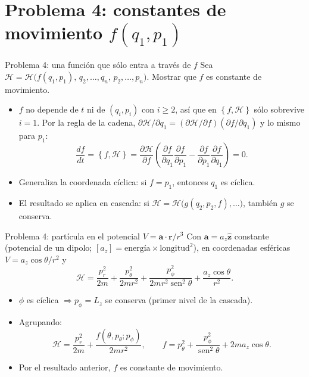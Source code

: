 \documentclass[spanish]{beamer}
\providecommand{\sen}{\operatorname{sen}}
\newcommand{\Ham}{\mathcal{H}}
\newcommand{\pd}[2]{\frac{\partial #1}{\partial #2}}
\newcommand{\pb}[2]{\left\{#1,#2\right\}}   %
\begin{document}
\section{Problema 4: constantes de movimiento \texorpdfstring{$f(q_1,p_1)$}{f(q1,p1)}}

\begin{frame}{Problema 4: una función que sólo entra a través de $f$}
Sea $\Ham = \Ham\big(f(q_1,p_1),\,q_2,\ldots,q_n,\,p_2,\ldots,p_n\big)$.
Mostrar que $f$ es constante de movimiento.
\begin{itemize}
  \item<2-> $f$ no depende de $t$ ni de $(q_i,p_i)$ con $i\ge 2$, así que en
        $\pb{f}{\Ham}$ sólo sobrevive $i=1$. Por la regla de la cadena,
        $\partial\Ham/\partial q_1 = (\partial\Ham/\partial f)(\partial f/\partial q_1)$
        y lo mismo para $p_1$:
  \[
    \frac{df}{dt} = \pb{f}{\Ham}
    = \pd{\Ham}{f}\left( \pd{f}{q_1}\pd{f}{p_1} - \pd{f}{p_1}\pd{f}{q_1} \right) = 0 .
  \]
  \item<3-> Generaliza la coordenada cíclica: si $f = p_1$, entonces $q_1$ es cíclica.
  \item<4-> El resultado se aplica en cascada: si $\Ham = \Ham\big(g(q_2,p_2,f),\ldots\big)$,
        también $g$ se conserva.
\end{itemize}
\end{frame}

\begin{frame}{Problema 4: partícula en el potencial $V = \mathbf a\cdot\mathbf r/r^3$}
Con $\mathbf a = a_z\hat{\mathbf z}$ constante (potencial de un dipolo;
$[a_z] = \text{energía}\times\text{longitud}^2$), en coordenadas esféricas
$V = a_z\cos\theta/r^2$ y
\[
  \Ham = \frac{p_r^2}{2m} + \frac{p_\theta^2}{2mr^2}
       + \frac{p_\phi^2}{2mr^2\sen^2\theta} + \frac{a_z\cos\theta}{r^2} .
\]
\begin{itemize}
  \item<2-> $\phi$ es cíclica $\Rightarrow p_\phi = L_z$ se conserva (primer nivel de la cascada).
  \item<3-> Agrupando:
  \[
    \Ham = \frac{p_r^2}{2m} + \frac{f(\theta,p_\theta;p_\phi)}{2mr^2},
    \qquad
    f = p_\theta^2 + \frac{p_\phi^2}{\sen^2\theta} + 2ma_z\cos\theta .
  \]
  \item<4-> Por el resultado anterior, $f$ es constante de movimiento.
\end{itemize}
\end{frame}
\end{document}

